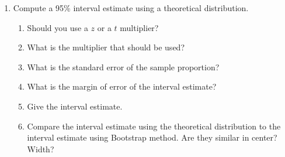 \begin{enumerate}
\begin{enumerate}
       \item Compute a 95\% interval estimate using a theoretical
         distribution.
         \begin{enumerate}
           \item Should you use a $z$ or a $t$ multiplier? 
\begin{students}
          \vspace{1cm}
\end{students}
\begin{key}
 {\it  }      
\end{key}
           \item What is the multiplier that should be used? 
\begin{students}
          \vspace{1cm}
\end{students}
\begin{key}
 {\it  }      
\end{key}
           \item What is the standard error of the sample proportion?
\begin{students}
          \vspace{1cm}
\end{students}
\begin{key}
 {\it  }      
\end{key}
           \item What is the margin of error of the interval estimate? \vspace{1cm}
           \item Give the interval estimate.
\begin{students}
          \vspace*{4cm}
\end{students}
\begin{key}
 {\it  }      
\end{key}
          
           \item Compare the interval estimate using the theoretical
             distribution to the interval estimate using Bootstrap
             method.  Are they similar in center?  Width? 
\begin{students}
          \vspace*{2cm}
\end{students}
\begin{key}
 {\it  }      
\end{key}
           \end{enumerate}


\end{enumerate}
\end{enumerate}
